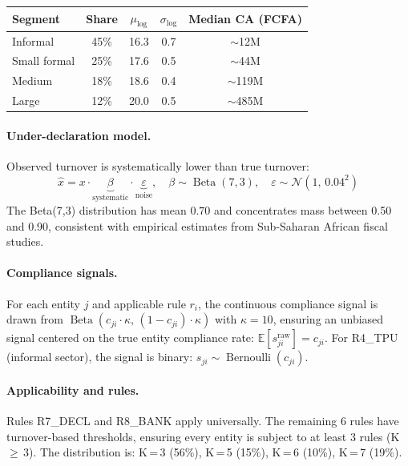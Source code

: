 \begin{center}
\renewcommand{\arraystretch}{1.15}
\begin{tabular}{lcccc}
\toprule
\textbf{Segment} & \textbf{Share} & \textbf{$\mu_{\log}$}
  & \textbf{$\sigma_{\log}$} & \textbf{Median CA (FCFA)} \\
\midrule
Informal      & 45\% & 16.3 & 0.7 & $\sim$12M \\
Small formal  & 25\% & 17.6 & 0.5 & $\sim$44M \\
Medium        & 18\% & 18.6 & 0.4 & $\sim$119M \\
Large         & 12\% & 20.0 & 0.5 & $\sim$485M \\
\bottomrule
\end{tabular}
\end{center}

\paragraph{Under-declaration model.}
Observed turnover is systematically lower than true turnover:
\[
  \hat{x} = x \cdot \underbrace{\beta}_{\text{systematic}} \cdot
  \underbrace{\varepsilon}_{\text{noise}}, \quad
  \beta \sim \operatorname{Beta}(7, 3), \quad
  \varepsilon \sim \mathcal{N}(1,\, 0.04^2)
\]
The Beta(7,3) distribution has mean $0.70$ and concentrates mass
between 0.50 and 0.90, consistent with empirical estimates from
Sub-Saharan African fiscal studies.

\paragraph{Compliance signals.}
For each entity $j$ and applicable rule $r_i$, the continuous
compliance signal is drawn from
$\operatorname{Beta}(c_{ji} \cdot \kappa,\, (1{-}c_{ji}) \cdot \kappa)$
with $\kappa = 10$, ensuring an unbiased signal centered on the true
entity compliance rate: $\mathbb{E}[s_{ji}^{\mathrm{raw}}] = c_{ji}$.
For R4\_TPU (informal sector), the signal is binary:
$s_{ji} \sim \operatorname{Bernoulli}(c_{ji})$.

\paragraph{Applicability and rules.}
Rules R7\_DECL and R8\_BANK apply universally. The remaining 6 rules
have turnover-based thresholds, ensuring every entity is subject to
at least 3 rules (K\,$\geq$\,3). The distribution is:
K\,=\,3 (56\%), K\,=\,5 (15\%), K\,=\,6 (10\%), K\,=\,7 (19\%).

